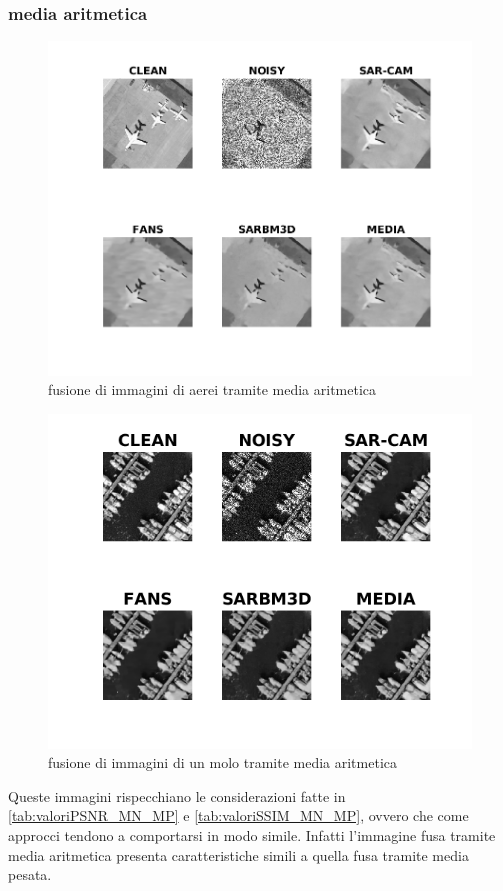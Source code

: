\subsubsection{media aritmetica}
\begin{figure}[H] 
    \centering
    \includegraphics[width=1.1\textwidth]{utils/MNairplane00.png}
    \caption{fusione di immagini di aerei tramite media aritmetica}
    \label{fig:airplane00MN}
  \end{figure}
  \begin{figure}[H] 
    \centering
    \includegraphics[width=1.0\textwidth]{utils/MNharbor03.png}
    \caption{fusione di immagini di un molo tramite media aritmetica}
    \label{fig:harbor03MN}
\end{figure}
Queste immagini rispecchiano le considerazioni fatte in \ref{tab:valoriPSNR_MN_MP} e \ref{tab:valoriSSIM_MN_MP}, ovvero che 
come approcci tendono a comportarsi in modo simile. Infatti l'immagine fusa tramite media aritmetica presenta caratteristiche simili a quella
fusa tramite media pesata. 

